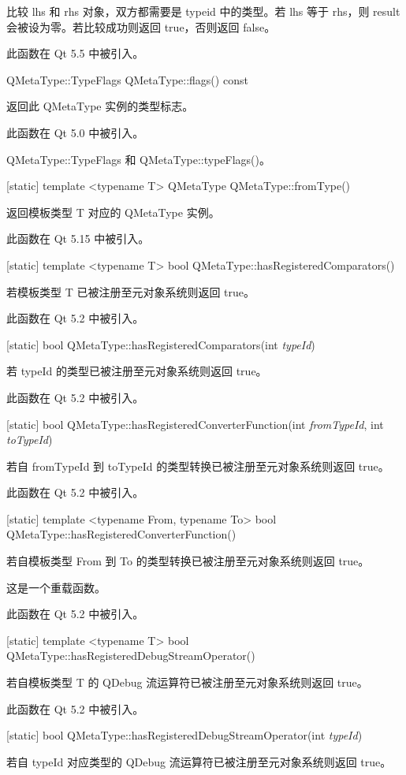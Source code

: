 比较 lhs 和 rhs 对象，双方都需要是 typeid 中的类型。若 lhs 等于 rhs，则 result 会被设为零。若比较成功则返回 true，否则返回 false。

此函数在 Qt 5.5 中被引入。

QMetaType::TypeFlags QMetaType::flags() const

返回此 QMetaType 实例的类型标志。

此函数在 Qt 5.0 中被引入。

\begin{seeAlso}
QMetaType::TypeFlags 和 QMetaType::typeFlags()。
\end{seeAlso}

[static] template <typename T> QMetaType QMetaType::fromType()

返回模板类型 T 对应的 QMetaType 实例。

此函数在 Qt 5.15 中被引入。

[static] template <typename T> bool QMetaType::hasRegisteredComparators()

若模板类型 T 已被注册至元对象系统则返回 true。

此函数在 Qt 5.2 中被引入。

[static] bool QMetaType::hasRegisteredComparators(int \emph{typeId})

若 typeId 的类型已被注册至元对象系统则返回 true。

此函数在 Qt 5.2 中被引入。

[static] bool QMetaType::hasRegisteredConverterFunction(int \emph{fromTypeId}, int \emph{toTypeId})

若自 fromTypeId 到 toTypeId 的类型转换已被注册至元对象系统则返回 true。

此函数在 Qt 5.2 中被引入。

[static] template <typename From, typename To> bool QMetaType::hasRegisteredConverterFunction()

若自模板类型 From 到 To 的类型转换已被注册至元对象系统则返回 true。

这是一个重载函数。

此函数在 Qt 5.2 中被引入。

[static] template <typename T> bool QMetaType::hasRegisteredDebugStreamOperator()

若自模板类型 T 的 QDebug 流运算符已被注册至元对象系统则返回 true。

此函数在 Qt 5.2 中被引入。

[static] bool QMetaType::hasRegisteredDebugStreamOperator(int \emph{typeId})

若自 typeId 对应类型的 QDebug 流运算符已被注册至元对象系统则返回 true。

